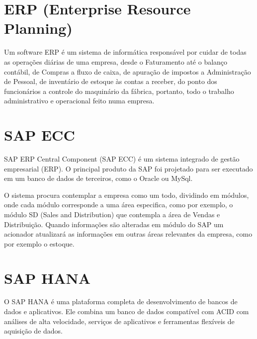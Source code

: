 \section{ERP (Enterprise Resource Planning)}
Um software ERP é um sistema de informática responsável por cuidar de todas as operações diárias de uma empresa, desde o Faturamento até o balanço contábil, de Compras a fluxo de caixa, de apuração de impostos a Administração de Pessoal, de inventário de estoque às contas a receber, do ponto dos funcionários a controle do maquinário da fábrica, portanto, todo o trabalho administrativo e operacional feito numa empresa. \cite{portalerp}


\section{SAP ECC}
SAP ERP Central Component (SAP ECC) é um sistema integrado de gestão empresarial (ERP). O principal produto da SAP foi projetado para ser executado em um banco de dados de terceiros, como o Oracle ou MySql.

O sistema procura contemplar a empresa como um todo, dividindo em módulos, onde cada módulo corresponde a uma área especifica, como por exemplo, o módulo SD (Sales and Distribution) que contempla a área de Vendas e Distribuição. Quando informações são alteradas em módulo do SAP um acionador atualizará as informações em outras áreas relevantes da empresa, como por exemplo o estoque. \cite{ecc}



\section{SAP HANA}

O SAP HANA é uma plataforma completa de desenvolvimento de bancos de dados e aplicativos. Ele combina um banco de dados compatível com ACID com análises de alta velocidade, serviços de aplicativos e ferramentas flexíveis de aquisição de dados. \cite{hana}

